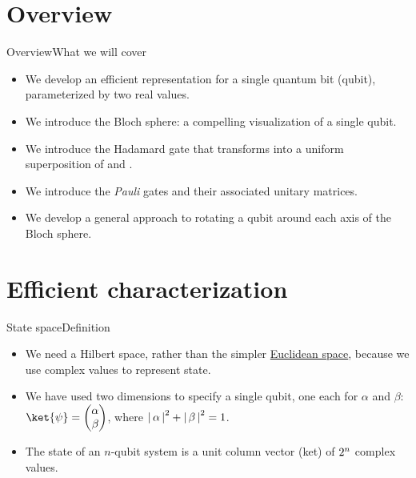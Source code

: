 
\section{Overview}
\begin{frame}{Overview}{What we will cover}
\begin{itemize}
    \item We develop an efficient representation for a single quantum bit (qubit), parameterized by two real values.
    \item We introduce the Bloch sphere: a compelling visualization of a single qubit.
    \item We introduce the Hadamard gate that transforms  into a uniform superposition of  and .
    \item We introduce the \emph{Pauli} gates and their associated unitary matrices.
    \item We develop a general approach to rotating a qubit around each axis of the Bloch sphere.
\end{itemize}
\end{frame}

\section{Efficient characterization}

\begin{frame}{State space}{Definition}
\Vskip{-3em}
\begin{itemize}
    \item We need a Hilbert space, rather than the simpler \href{https://en.wikipedia.org/wiki/Euclidean_space}{Euclidean space}, because we use complex values to represent state.
    \item We have used two dimensions to specify a single qubit, one each for $\alpha$ and $\beta$: $\ket{\psi}=\SQB{\alpha}{\beta}$, where
    ${|\,\alpha\,|}^{2}+{|\,\beta\,|}^{2}=1$.
  
    \item The state of an $n$-qubit system is a unit column vector (ket)  of $2^{n}$ complex values.
\end{itemize}
\end{frame}

